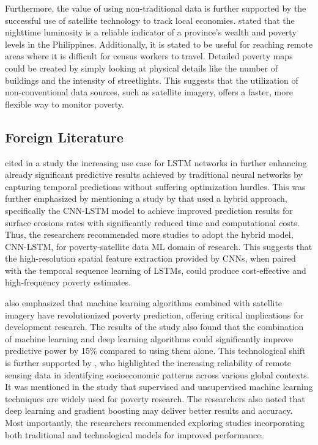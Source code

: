 \documentclass[12pt, letterpaper]{article}
\numberwithin{figure}{section}
\numberwithin{table}{section}
\begin{document}
Furthermore, the value of using non-traditional data is further
supported by the successful use of satellite technology to track
local economies. \textcite{Martinez2016} stated that the nighttime
luminosity is a reliable indicator of a province's wealth and poverty
levels in the Philippines. Additionally, it is stated to be useful
for reaching remote areas where it is difficult for census workers to
travel. Detailed poverty maps could be created by simply looking at
physical details like the number of buildings and the intensity of
streetlights. This suggests that the utilization of non-conventional
data sources, such as satellite imagery, offers a faster, more
flexible way to monitor poverty.

\subsection{Foreign Literature}
\textcite{Hall2023} cited in a study the increasing use case for LSTM
networks in further enhancing already significant predictive results
achieved by traditional neural networks by capturing temporal
predictions without suffering optimization hurdles. This was further
emphasized by mentioning a study by \textcite{Yang2022} that used a
hybrid approach, specifically the CNN-LSTM model to achieve improved
prediction results for surface erosions rates with significantly
reduced time and computational costs. Thus, the researchers
recommended more studies to adopt the hybrid model, CNN-LSTM, for
poverty-satellite data ML domain of research. This suggests that the
high-resolution spatial feature extraction provided by CNNs, when
paired with the temporal sequence learning of LSTMs, could produce
cost-effective and high-frequency poverty estimates.

\textcite{Hall2023} also emphasized that machine learning algorithms
combined with satellite imagery have revolutionized poverty
prediction, offering critical implications for development research.
The results of the study also found that the combination of machine
learning and deep learning algorithms could significantly improve
predictive power by 15\% compared to using them alone. This
technological shift is further supported by
\textcite{Lamichhane2025}, who highlighted the increasing reliability
of remote sensing data in identifying socioeconomic patterns across
various global contexts. It was mentioned in the study that
supervised and unsupervised machine learning techniques are widely
used for poverty research. The researchers also noted that deep
learning and gradient boosting may deliver better results and
accuracy. Most importantly, the researchers recommended exploring
studies incorporating both traditional and technological models for
improved performance.
\end{document}

